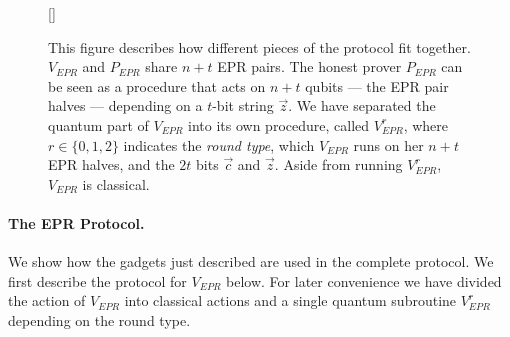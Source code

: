 \documentclass[11pt,letter]{article}
\theoremstyle{remark}
\theoremstyle{definition}
\begin{document}
\begin{figure}[h]
[\FBwidth]
{}
{\caption{This figure describes how different pieces of the protocol fit together. $V_{EPR}$ and $P_{EPR}$ share $n+t$ EPR pairs. The honest prover $P_{EPR}$ can be seen as a procedure that acts on $n+t$ qubits --- the EPR pair halves --- depending on a $t$-bit string $\vec{z}$.  We have separated the quantum part of $V_{EPR}$ into its own procedure, called $V_{EPR}^{r}$, where $r\in\{0,1,2\}$ indicates the \emph{round type}, which $V_{EPR}$ runs on her $n+t$ EPR halves, and the $2t$ bits $\vec{c}$ and $\vec{z}$. Aside from running $V_{EPR}^r$, $V_{EPR}$ is classical. }\label{fig:EPR-high-level}}
\end{figure}



\paragraph{The EPR Protocol.} We show how the gadgets just described are used in the complete protocol. We first describe the protocol for $V_{EPR}$ below.  For later convenience we have divided the action of $V_{EPR}$ into classical actions and a single quantum subroutine $V_{EPR}^r$ depending on the round type. 
\end{document}
